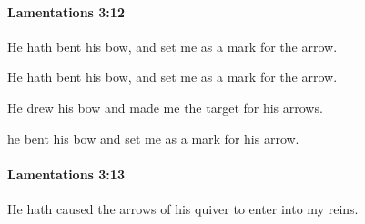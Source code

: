 		\paragraph{Lamentations 3:12} %
			\label{LAMENTATIONS-3-12}

			He hath bent his bow, and set me as a mark for the arrow.

			\begin{versebox}
					\item[BHS] 
					\item[LXX] 
					\item[ASV] He hath bent his bow, and set me as a mark for the arrow.
					\item[NIV] He drew his bow and made me the target for his arrows.
					\item[NRSV] he bent his bow and set me as a mark for his arrow.
			\end{versebox}

		\paragraph{Lamentations 3:13} %
			\label{LAMENTATIONS-3-13}

			He hath caused the arrows of his quiver to enter into my reins.

